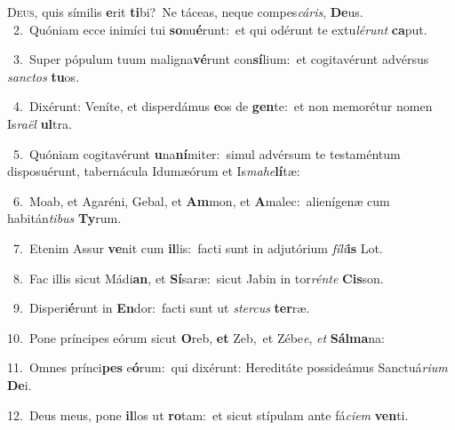 \lettrine{\initial\textcolor{\initialcolor}{D}}{eus,} quis símilis \textbf{e}\-rit \textbf{ti}\-bi?~\star Ne táceas, neque compes\-\textit{cá}\-\textit{ris}, \textbf{De}\-us.\\
{\numbfont\textcolor{\numbcolor}{~2.}}~Quóniam ecce inimíci tui \textbf{so}\-nu\-\textbf{é}\-runt:~\star et qui odérunt te extu\-\textit{lé}\-\textit{runt} \textbf{ca}\-put.\par
{\numbfont\textcolor{\numbcolor}{~3.}}~Super pópulum tuum maligna\-\textbf{vé}\-runt con\-\textbf{sí}\-lium:~\star et cogitavérunt advérsus \textit{sanc}\-\textit{tos} \textbf{tu}\-os.\par
{\numbfont\textcolor{\numbcolor}{~4.}}~Dixérunt: Veníte, et disperdámus \textbf{e}\-os de \textbf{gen}\-te:~\star et non memorétur nomen Is\-\textit{ra}\-\textit{ël} \textbf{ul}\-tra.\par
{\numbfont\textcolor{\numbcolor}{~5.}}~Quóniam cogitavérunt \textbf{u}\-na\-\textbf{ní}\-miter:~\star simul advérsum te testaméntum disposuérunt, tabernácula Idumæórum et Is\-\textit{ma}\-\textit{he}\textbf{lí}tæ:\par
{\numbfont\textcolor{\numbcolor}{~6.}}~Moab, et Agaréni, Gebal, et \textbf{Am}\-mon, et \textbf{A}\-malec:~\star alienígenæ cum habitán\-\textit{ti}\-\textit{bus} \textbf{Ty}\-rum.\par
{\numbfont\textcolor{\numbcolor}{~7.}}~Etenim Assur \textbf{ve}\-nit cum \textbf{il}\-lis:~\star facti sunt in adjutórium \textit{fí}\-\textit{li}\textbf{is} Lot.\par
{\numbfont\textcolor{\numbcolor}{~8.}}~Fac illis sicut Mádi\-\textbf{an}\-, et \textbf{Sí}\-saræ:~\star sicut Jabin in tor\-\textit{rén}\-\textit{te} \textbf{Cis}\-son.\par
{\numbfont\textcolor{\numbcolor}{~9.}}~Disperi\-\textbf{é}\-runt in \textbf{En}\-dor:~\star facti sunt ut \textit{ster}\-\textit{cus} \textbf{ter}\-ræ.\par
{\numbfont\textcolor{\numbcolor}{10.}}~Pone príncipes eórum sicut \textbf{O}\-reb, \textbf{et} Zeb,~\star et Zébe\-\textit{e}\-, \textit{et} \textbf{Sál}\-\textbf{ma}na:\par
{\numbfont\textcolor{\numbcolor}{11.}}~Omnes prínci\textbf{pes} e\-\textbf{ó}\-rum:~\star qui dixérunt: Hereditáte possideámus Sanctuá\-\textit{ri}\-\textit{um} \textbf{De}\-i.\par
{\numbfont\textcolor{\numbcolor}{12.}}~Deus meus, pone \textbf{il}\-los ut \textbf{ro}\-tam:~\star et sicut stípulam ante fá\-\textit{ci}\-\textit{em} \textbf{ven}\-ti.\par

